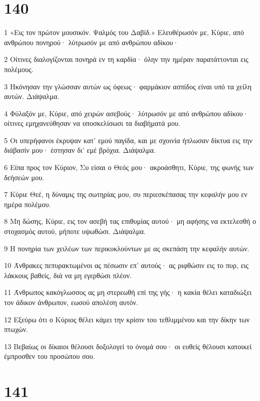 \chapter{140}

\par 1 «Εις τον πρώτον μουσικόν. Ψαλμός του Δαβίδ.» Ελευθέρωσόν με, Κύριε, από ανθρώπου πονηρού· λύτρωσόν με από ανθρώπου αδίκου·
\par 2 Οίτινες διαλογίζονται πονηρά εν τη καρδία· όλην την ημέραν παρατάττονται εις πολέμους.
\par 3 Ηκόνησαν την γλώσσαν αυτών ως όφεως· φαρμάκιον ασπίδος είναι υπό τα χείλη αυτών. Διάψαλμα.
\par 4 Φύλαξόν με, Κύριε, από χειρών ασεβούς· λύτρωσόν με από ανθρώπου αδίκου· οίτινες εμηχανεύθησαν να υποσκελίσωσι τα διαβήματά μου.
\par 5 Οι υπερήφανοι έκρυψαν κατ' εμού παγίδα, και με σχοινία ήπλωσαν δίκτυα εις την διάβασίν μου· έστησαν δι' εμέ βρόχια. Διάψαλμα.
\par 6 Είπα προς τον Κύριον, Συ είσαι ο Θεός μου· ακροάσθητι, Κύριε, της φωνής των δεήσεών μου.
\par 7 Κύριε Θεέ, η δύναμις της σωτηρίας μου, συ περιεσκέπασας την κεφαλήν μου εν ημέρα πολέμου.
\par 8 Μη δώσης, Κύριε, εις τον ασεβή τας επιθυμίας αυτού· μη αφήσης να εκτελεσθή ο στοχασμός αυτού, μήποτε υψωθώσι. Διάψαλμα.
\par 9 Η πονηρία των χειλέων των περικυκλούντων με ας σκεπάση την κεφαλήν αυτών.
\par 10 Άνθρακες πεπυρακτωμένοι ας πέσωσιν επ' αυτούς· ας ριφθώσιν εις το πυρ, εις λάκκους βαθείς, διά να μη εγερθώσι πλέον.
\par 11 Άνθρωπος κακόγλωσσος ας μη στερεωθή επί της γής· η κακία θέλει καταδιώξει τον άδικον άνθρωπον, εωσού απολέση αυτόν.
\par 12 Εξεύρω ότι ο Κύριος θέλει κάμει την κρίσιν του τεθλιμμένου και την δίκην των πτωχών.
\par 13 Βεβαίως οι δίκαιοι θέλουσι δοξολογεί το όνομά σου· οι ευθείς θέλουσι κατοικεί έμπροσθεν του προσώπου σου.

\chapter{141}

